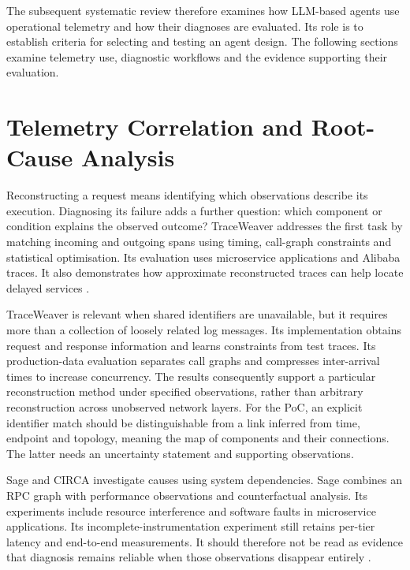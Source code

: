 The subsequent systematic review therefore examines how LLM-based agents
use operational telemetry and how their diagnoses are evaluated. Its role
is to establish criteria for selecting and testing an agent design.
The following sections examine telemetry use, diagnostic workflows and
the evidence supporting their evaluation.

\section{Telemetry Correlation and Root-Cause Analysis}
\label{sec:state-of-the-art:correlation}

Reconstructing a request means identifying which observations describe
its execution. Diagnosing its failure adds a further question: which
component or condition explains the observed outcome? TraceWeaver addresses
the first task by matching incoming and outgoing spans using timing,
call-graph constraints and statistical optimisation. Its evaluation uses
microservice applications and Alibaba traces. It also demonstrates how
approximate reconstructed traces can help locate delayed services
\parencite[Sections~4--6]{ashok2024traceweaver}.

TraceWeaver is relevant when shared identifiers are unavailable, but it
requires more than a collection of loosely related log messages. Its
implementation obtains request and response information and learns
constraints from test traces. Its production-data evaluation separates call
graphs and compresses inter-arrival times to increase concurrency. The
results consequently support a particular reconstruction method under
specified observations, rather than arbitrary reconstruction across
unobserved network layers. For the PoC, an explicit identifier match should
be distinguishable from a link inferred from time, endpoint and topology,
meaning the map of components and their connections.
The latter needs an uncertainty statement and supporting observations.

Sage and CIRCA investigate causes using system dependencies. Sage combines
an RPC graph with performance observations and counterfactual analysis.
Its experiments include resource interference and software faults in
microservice applications. Its incomplete-instrumentation experiment still
retains per-tier latency and end-to-end measurements. It should therefore
not be read as evidence that diagnosis remains reliable when those
observations disappear entirely
\parencite[Sections~5--6]{gan2021sage}.

